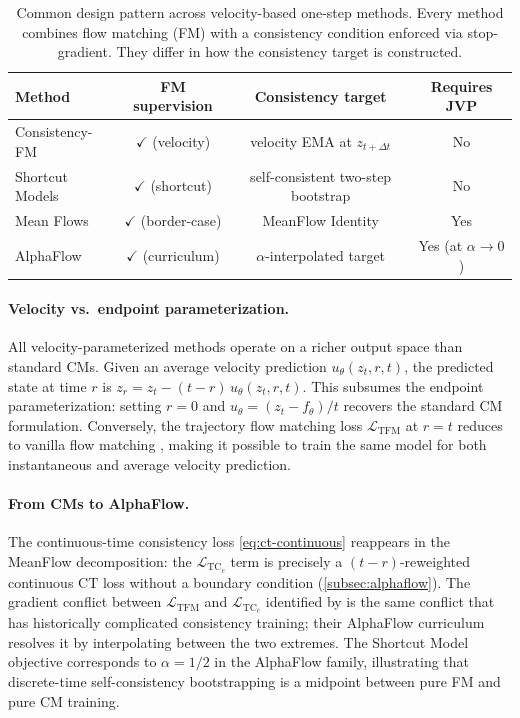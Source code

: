 \begin{table}[htbp]
  \centering
  \small
  \caption{Common design pattern across velocity-based one-step methods. Every method combines flow matching (FM) with a consistency condition enforced via stop-gradient. They differ in how the consistency target is constructed.}
  \label{tab:cm-lineage}
  \begin{tabular}{@{}l c c c@{}}
    \toprule
    Method & FM supervision & Consistency target & Requires JVP \\
    \midrule
    Consistency-FM \citep{zhou2024consistency}   & $\checkmark$ (velocity)     & velocity EMA at $z_{t+\Delta t}$  & No \\
    Shortcut Models \citep{frans2024shortcut}    & $\checkmark$ (shortcut)     & self-consistent two-step bootstrap & No \\
    Mean Flows \citep{geng2025mean}              & $\checkmark$ (border-case)  & MeanFlow Identity                  & Yes \\
    AlphaFlow \citep{zhang2025alphaflow}         & $\checkmark$ (curriculum)   & $\alpha$-interpolated target       & Yes (at $\alpha\to 0$) \\
    \bottomrule
  \end{tabular}
\end{table}

\paragraph{Velocity vs.\ endpoint parameterization.} All velocity-parameterized methods operate on a richer output space than standard CMs. Given an average velocity prediction $u_\theta(z_t, r, t)$, the predicted state at time $r$ is $z_r = z_t - (t-r) \, u_\theta(z_t, r, t)$. This subsumes the endpoint parameterization: setting $r = 0$ and $u_\theta = (z_t - f_\theta)/t$ recovers the standard CM formulation. Conversely, the trajectory flow matching loss $\mathcal{L}_{\text{TFM}}$ at $r = t$ reduces to vanilla flow matching \citep{zhang2025alphaflow}, making it possible to train the same model for both instantaneous and average velocity prediction.

\paragraph{From CMs to AlphaFlow.} The continuous-time consistency loss \cref{eq:ct-continuous} reappears in the MeanFlow decomposition: the $\mathcal{L}_{\text{TC}_c}$ term is precisely a $(t-r)$-reweighted continuous CT loss without a boundary condition (\cref{subsec:alphaflow}). The gradient conflict between $\mathcal{L}_{\text{TFM}}$ and $\mathcal{L}_{\text{TC}_c}$ identified by \citet{zhang2025alphaflow} is the same conflict that has historically complicated consistency training; their AlphaFlow curriculum resolves it by interpolating between the two extremes. The Shortcut Model objective corresponds to $\alpha = 1/2$ in the AlphaFlow family, illustrating that discrete-time self-consistency bootstrapping is a midpoint between pure FM and pure CM training.

